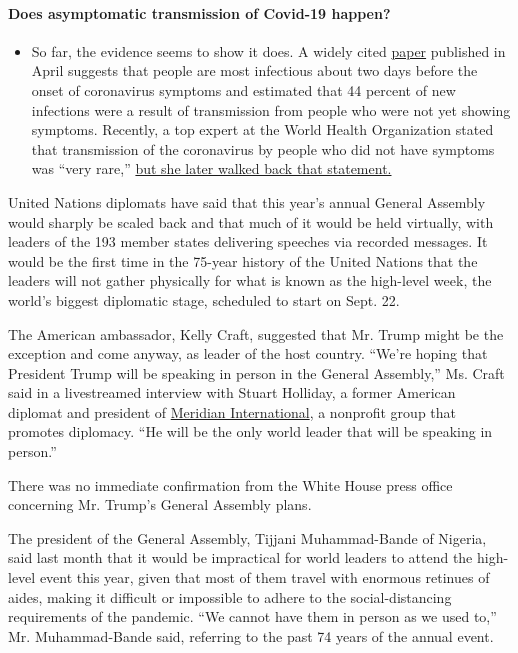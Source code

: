 \begin{itemize}
{  \paragraph{Does asymptomatic transmission of Covid-19
  happen?}\label{does-asymptomatic-transmission-of-covid-19-happen}}

  \begin{itemize}
  \tightlist
  \item
    So far, the evidence seems to show it does. A widely cited
    \href{https://www.nature.com/articles/s41591-020-0869-5}{paper}
    published in April suggests that people are most infectious about
    two days before the onset of coronavirus symptoms and estimated that
    44 percent of new infections were a result of transmission from
    people who were not yet showing symptoms. Recently, a top expert at
    the World Health Organization stated that transmission of the
    coronavirus by people who did not have symptoms was ``very rare,''
    \href{https://www.nytimes3xbfgragh.onion/2020/06/09/world/coronavirus-updates.html?action=click\&pgtype=Article\&state=default\&region=MAIN_CONTENT_3\&context=storylines_faq\#link-1f302e21}{but
    she later walked back that statement.}
  \end{itemize}
\end{itemize}

United Nations diplomats have said that this year's annual General
Assembly would sharply be scaled back and that much of it would be held
virtually, with leaders of the 193 member states delivering speeches via
recorded messages. It would be the first time in the 75-year history of
the United Nations that the leaders will not gather physically for what
is known as the high-level week, the world's biggest diplomatic stage,
scheduled to start on Sept. 22.

The American ambassador, Kelly Craft, suggested that Mr. Trump might be
the exception and come anyway, as leader of the host country. ``We're
hoping that President Trump will be speaking in person in the General
Assembly,'' Ms. Craft said in a livestreamed interview with Stuart
Holliday, a former American diplomat and president of
\href{https://www.meridian.org/}{Meridian International}, a nonprofit
group that promotes diplomacy. ``He will be the only world leader that
will be speaking in person.''

There was no immediate confirmation from the White House press office
concerning Mr. Trump's General Assembly plans.

The president of the General Assembly, Tijjani Muhammad-Bande of
Nigeria, said last month that it would be impractical for world leaders
to attend the high-level event this year, given that most of them travel
with enormous retinues of aides, making it difficult or impossible to
adhere to the social-distancing requirements of the pandemic. ``We
cannot have them in person as we used to,'' Mr. Muhammad-Bande said,
referring to the past 74 years of the annual event.

